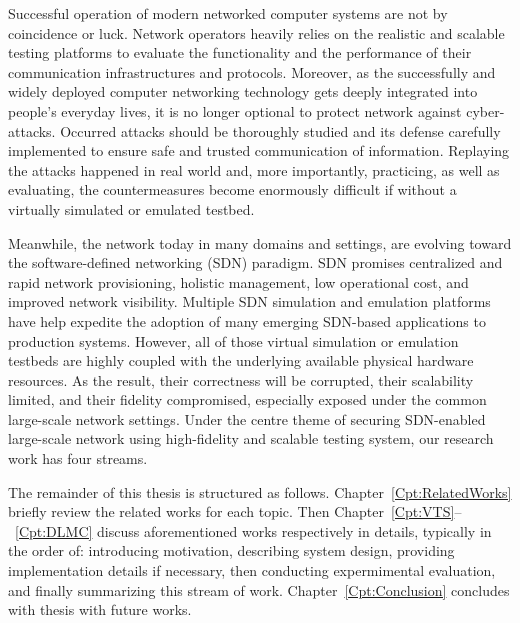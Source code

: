 
Successful operation of modern networked computer systems are not by coincidence or luck.
Network operators heavily relies on the realistic and scalable testing platforms to
evaluate the functionality and the performance of their communication infrastructures and protocols.
Moreover, as the successfully and widely deployed computer networking technology gets deeply integrated into people's everyday lives,
it is no longer optional to protect network against cyber-attacks.
Occurred attacks should be thoroughly studied and its defense carefully implemented to ensure safe and trusted communication of information.
Replaying the attacks happened in real world and, more importantly, practicing, as well as evaluating, the countermeasures become 
enormously difficult if without a virtually simulated or emulated testbed.

Meanwhile, the network today in many domains and settings, are evolving toward the software-defined networking (SDN) paradigm.
SDN promises centralized and rapid network provisioning, holistic management, low operational cost, and improved network visibility.
Multiple SDN simulation and emulation platforms have help expedite the adoption of many emerging SDN-based applications to production systems.
However, all of those virtual simulation or emulation testbeds are highly coupled with the underlying available physical hardware resources.
As the result, their correctness will be corrupted, their scalability limited, and their fidelity compromised,
especially exposed under the common large-scale network settings.
Under the centre theme of securing SDN-enabled large-scale network using high-fidelity and scalable testing system, our research work has four streams.






The remainder of this thesis is structured as follows.
Chapter~\ref{Cpt:RelatedWorks} briefly review the related works for each topic.
Then Chapter~\ref{Cpt:VTS}--~\ref{Cpt:DLMC} discuss aforementioned works respectively in details,
typically in the order of: introducing motivation, describing system design, providing implementation details if necessary,
then conducting expermimental evaluation, and finally summarizing this stream of work.
Chapter~\ref{Cpt:Conclusion} concludes with thesis with future works.

